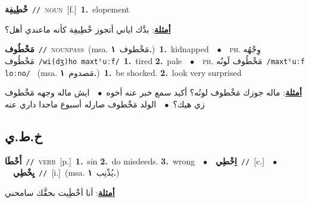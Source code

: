 \documentclass[10pt,a4paper,twoside]{article} %
\begin{document}
\begin{multicols}{2}
{\setlength\topsep{0pt}\textbf{\foreignlanguage{arabic}{خْطِيفِة}}\ {\color{gray}\texttt{//}\color{black}}\ \textsc{noun}\ [f.]\ \textbf{1.}~elopement\  \begin{flushright}\color{gray}\foreignlanguage{arabic}{\textbf{\underline{\foreignlanguage{arabic}{أمثلة}}}: بدَّك اياني أتجوز خْطِيفِة كأنه ماعندي أهل؟}\end{flushright}\color{black}} \vspace{2mm}

{\setlength\topsep{0pt}\textbf{\foreignlanguage{arabic}{مَخْطُوف}}\ {\color{gray}\texttt{//}\color{black}}\ \textsc{noun\textunderscore pass}\ \color{gray}(msa. \foreignlanguage{arabic}{مَخْطوف}~\foreignlanguage{arabic}{\textbf{١.}})\color{black}\ \textbf{1.}~kidnapped\ \ $\bullet$\ \ \textsc{ph.} \color{gray} \foreignlanguage{arabic}{وِجْهُه مَخْطُوف}\color{black}\ {\color{gray}\texttt{/{\sffamily wi(dʒ)ho maxtˤuːf}/}\color{black}}\ \textbf{1.}~tired  \textbf{2.}~pale\ \ $\bullet$\ \ \textsc{ph.} \color{gray} \foreignlanguage{arabic}{مَخْطُوف لَونُه}\color{black}\ {\color{gray}\texttt{/{\sffamily maxtˤuːf loːno}/}\color{black}}\ \color{gray} (msa. \foreignlanguage{arabic}{مَصدوم}~\foreignlanguage{arabic}{\textbf{١.}})\color{black}\ \textbf{1.}~be shocked.  \textbf{2.}~look very surprised\  \begin{flushright}\color{gray}\foreignlanguage{arabic}{\textbf{\underline{\foreignlanguage{arabic}{أمثلة}}}: ماله جوزك مَخْطوف لونُه؟ أكيد سمع خبر عنه أخوه\ $\bullet$\ \  ايش ماله وجهه مَخْطوف زي هيك؟\ $\bullet$\ \  الولد مَخْطوف صارله أسبوع ماحدا داري عنه}\end{flushright}\color{black}} \vspace{2mm}

\vspace{-3mm}
\subsection*{\color{blue}\foreignlanguage{arabic}{خ.ط.ي}\color{blue}{}} 

{\setlength\topsep{0pt}\textbf{\foreignlanguage{arabic}{أَخْطَا}}\ {\color{gray}\texttt{//}\color{black}}\ \textsc{verb}\ [p.]\ \textbf{1.}~sin  \textbf{2.}~do misdeeds.  \textbf{3.}~wrong\ \ $\bullet$\ \ \setlength\topsep{0pt}\textbf{\foreignlanguage{arabic}{اِخْطِي}}\ {\color{gray}\texttt{//}\color{black}}\ [c.]\ \ $\bullet$\ \ \setlength\topsep{0pt}\textbf{\foreignlanguage{arabic}{يِخْطِي}}\ {\color{gray}\texttt{//}\color{black}}\ [i.]\ \color{gray}(msa. \foreignlanguage{arabic}{يُذْنِب}~\foreignlanguage{arabic}{\textbf{١.}})\color{black}\  \begin{flushright}\color{gray}\foreignlanguage{arabic}{\textbf{\underline{\foreignlanguage{arabic}{أمثلة}}}: أنا أخْطَِيت بحقَّك سامحني}\end{flushright}\color{black}} \vspace{2mm}


\end{multicols}
\end{document}
